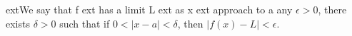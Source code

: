\documentclass[preview]{standalone}
\begin{document}
\begin{center}
{ext{We say that } f 	ext{ has a limit } L 	ext{ as } x 	ext{ approach to } a} \Given any $\epsilon > 0$, there exists $\delta > 0$ such that if $0 < |x - a| < \delta$, then $|f(x) - L| < \epsilon$.
\end{center}
\end{document}
